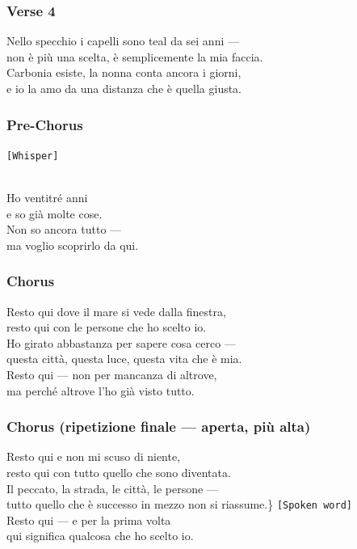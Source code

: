 \subsubsection{Verse 4}\label{verse-4-9}

Nello specchio i capelli sono teal da sei anni ---\\
non è più una scelta, è semplicemente la mia faccia.\\
Carbonia esiste, la nonna conta ancora i giorni,\\
e io la amo da una distanza che è quella giusta.

\subsubsection{Pre-Chorus}\label{pre-chorus-33}

\texttt{{[}Whisper{]}}\strut \\
Ho ventitré anni\\
e so già molte cose.\\
Non so ancora tutto ---\\
ma voglio scoprirlo da qui.

\subsubsection{Chorus}\label{chorus-48}

Resto qui dove il mare si vede dalla finestra,\\
resto qui con le persone che ho scelto io.\\
Ho girato abbastanza per sapere cosa cerco ---\\
questa città, questa luce, questa vita che è mia.\\
Resto qui --- non per mancanza di altrove,\\
ma perché altrove l'ho già visto tutto.

\subsubsection{Chorus (ripetizione finale --- aperta, più
alta)}\label{chorus-ripetizione-finale-aperta-piuxf9-alta}

Resto qui e non mi scuso di niente,\\
resto qui con tutto quello che sono diventata.\\
Il peccato, la strada, le città, le persone ---\\
tutto quello che è successo in mezzo non si riassume.\}
\texttt{{[}Spoken\ word{]}}\\
Resto qui --- e per la prima volta\\
qui significa qualcosa che ho scelto io.

